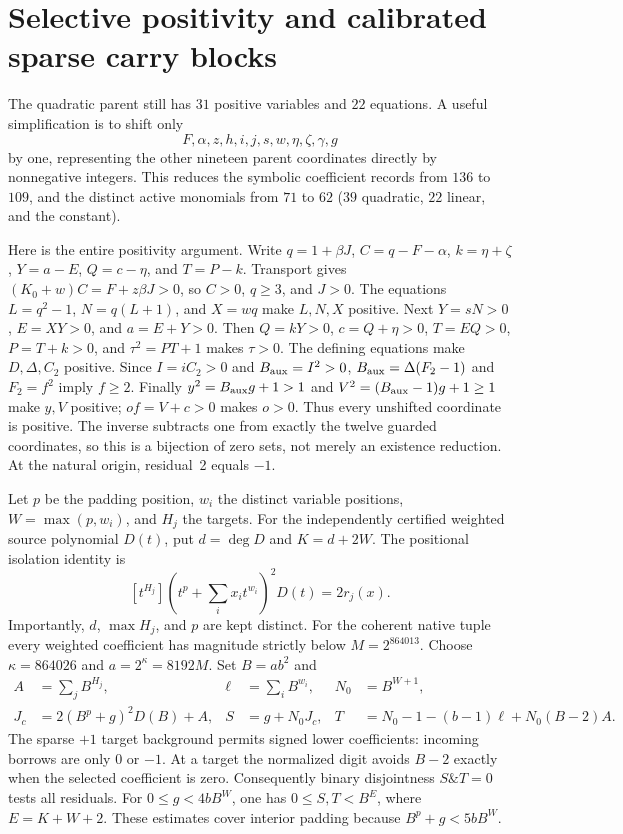 \section{Selective positivity and calibrated sparse carry blocks}

The quadratic parent still has $31$ positive variables and $22$ equations.
A useful simplification is to shift only
\[
 F,\alpha,z,h,i,j,s,w,\eta,\zeta,\gamma,g
\]
by one, representing the other nineteen parent coordinates directly by
nonnegative integers. This reduces the symbolic coefficient records from
$136$ to $109$, and the distinct active monomials from $71$ to $62$
($39$ quadratic, $22$ linear, and the constant).

Here is the entire positivity argument. Write $q=1+\beta J$,
$C=q-F-\alpha$, $k=\eta+\zeta$, $Y=a-E$, $Q=c-\eta$, and $T=P-k$.
Transport gives $(K_0+w)C=F+z\beta J>0$, so $C>0$, $q\ge3$, and $J>0$.
The equations $L=q^2-1$, $N=q(L+1)$, and $X=wq$ make $L,N,X$ positive.
Next $Y=sN>0$, $E=XY>0$, and $a=E+Y>0$.
Then $Q=kY>0$, $c=Q+\eta>0$, $T=EQ>0$, $P=T+k>0$, and
$\tau^2=PT+1$ makes $\tau>0$.
The defining equations make $D,\Delta,C_2$ positive.
Since $I=iC_2>0$ and $B_{\rm aux}=I^2>0$,
$B_{\rm aux}=\Delta(F_2-1)$ and $F_2=f^2$ imply $f\ge2$.
Finally $y^2=B_{\rm aux}g+1>1$ and
$V^2=(B_{\rm aux}-1)g+1\ge1$ make $y,V$ positive;
$of=V+c>0$ makes $o>0$. Thus every unshifted coordinate is positive.
The inverse subtracts one from exactly the twelve guarded coordinates,
so this is a bijection of zero sets, not merely an existence reduction.
At the natural origin, residual~2 equals $-1$.

Let $p$ be the padding position, $w_i$ the distinct variable positions,
$W=\max(p,w_i)$, and $H_j$ the targets. For the independently certified
weighted source polynomial $D(t)$, put $d=\deg D$ and $K=d+2W$.
The positional isolation identity is
\[
 [t^{H_j}]\left(t^p+\sum_i x_it^{w_i}\right)^2D(t)=2r_j(x).
\]
Importantly, $d$, $\max H_j$, and $p$ are kept distinct.
For the coherent native tuple every weighted coefficient has magnitude
strictly below $M=2^{864013}$. Choose
$\kappa=864026$ and $a=2^\kappa=8192M$.
Set $B=ab^2$ and
\begin{align*}
 A&=\sum_jB^{H_j},&\ell&=\sum_iB^{w_i},&N_0&=B^{W+1},\\
 J_c&=2(B^p+g)^2D(B)+A,&
 S&=g+N_0J_c,&
 T&=N_0-1-(b-1)\ell+N_0(B-2)A.
\end{align*}
The sparse $+1$ target background permits signed lower coefficients:
incoming borrows are only $0$ or $-1$. At a target the normalized digit
avoids $B-2$ exactly when the selected coefficient is zero.
Consequently binary disjointness $S\mathbin{\&}T=0$ tests all residuals.
For $0\le g<4bB^W$, one has $0\le S,T<B^E$, where $E=K+W+2$.
These estimates cover interior padding because $B^p+g<5bB^W$.

